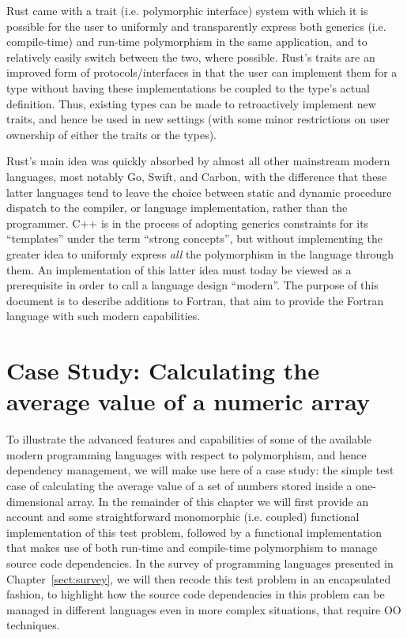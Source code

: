 \documentclass[11pt,oneside]{report}
\begin{document}
Rust came with a trait (i.e. polymorphic interface) system with which
it is possible for the user to uniformly and transparently express
both generics (i.e. compile-time) and run-time polymorphism in the
same application, and to relatively easily switch between the two,
where possible. Rust's traits are an improved form of
protocols/interfaces in that the user can implement them for a type
without having these implementations be coupled to the type's actual
definition. Thus, existing types can be made to retroactively
implement new traits, and hence be used in new settings (with some
minor restrictions on user ownership of either the traits or the
types).

Rust's main idea was quickly absorbed by almost all other mainstream
modern languages, most notably Go, Swift, and Carbon, with the
difference that these latter languages tend to leave the choice
between static and dynamic procedure dispatch to the compiler, or
language implementation, rather than the programmer. C++ is in the
process of adopting generics constraints for its ``templates'' under
the term ``strong concepts'', but without implementing the greater
idea to uniformly express \emph{all} the polymorphism in the language
through them. An implementation of this latter idea must today be
viewed as a prerequisite in order to call a language design
``modern''. The purpose of this document is to describe additions to
Fortran, that aim to provide the Fortran language with such modern
capabilities.

\chapter{Case Study: Calculating the average value of a numeric array}

To illustrate the advanced features and capabilities of some of the
available modern programming languages with respect to polymorphism,
and hence dependency management, we will make use here of a case
study: the simple test case of calculating the average value of a set
of numbers stored inside a one-dimensional array. In the remainder of
this chapter we will first provide an account and some straightforward
monomorphic (i.e. coupled) functional implementation of this test
problem, followed by a functional implementation that makes use of
both run-time and compile-time polymorphism to manage source code
dependencies. In the survey of programming languages presented in
Chapter~\ref{sect:survey}, we will then recode this test problem in an
encapsulated fashion, to highlight how the source code dependencies in
this problem can be managed in different languages even in more
complex situations, that require OO techniques.
\end{document}
